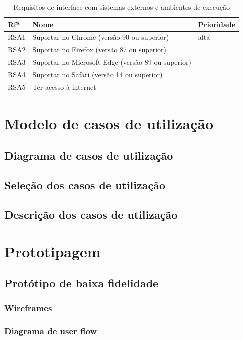 \documentclass[11pt, twoside]{report}
\begin{document}
		\begin{table}[H]
		\centering
		\caption{Requisitos de interface com sistemas externos e ambientes de execução}	
		\vspace{0.5cm}
		\begin{tabular}{|l|l|l|}
			\hline
			Rfª & Nome & Prioridade\\
			\hline
			RSA1 & Suportar no Chrome (versão 90 ou superior) &alta\\
			\hline
			RSA2 &Suportar no Firefox (versão 87 ou superior) &\\
			\hline
			RSA3 &Suportar no Microsoft Edge (versão 89 ou superior)&\\
			\hline
			RSA4 &Suportar no Safari (versão 14 ou superior)&\\
			\hline
			RSA5 &Ter acesso à internet&\\
			\hline
		\end{tabular}
		\label{requisitosdesistemas}
	\end{table}
	
	\chapter{Modelo de casos de utilização}
	\section{Diagrama de casos de utilização}
	\section{Seleção dos casos de utilização}
	\section{Descrição dos casos de utilização}
	
	\chapter{Prototipagem}
	\section{Protótipo de baixa fidelidade}
	\subsection{Wireframes}
	\subsection{Diagrama de user flow}
\end{document}

